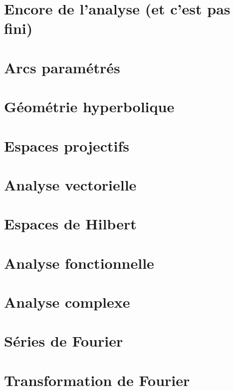 \documentclass[a4paper,twoside,11pt]{book}
\begin{document}
\chapter{Encore de l'analyse (et c'est pas fini)}





\chapter{Arcs paramétrés}




\chapter{Géométrie hyperbolique}


\chapter{Espaces projectifs}




\chapter{Analyse vectorielle}


\chapter{Espaces de Hilbert}


\chapter{Analyse fonctionnelle}



\chapter{Analyse complexe}          \label{ChapICHIooXbLccl}



\chapter{Séries de Fourier}


\chapter{Transformation de Fourier}

\end{document}
